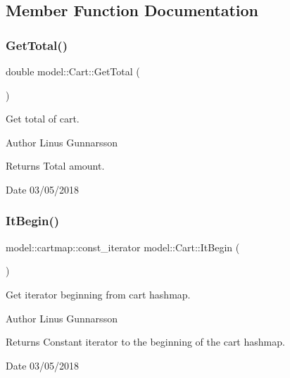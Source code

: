 \subsection{Member Function Documentation}
\mbox{\label{classmodel_1_1Cart_ad214fba3ad7b762c89e0bf5336d8a312}} 
\subsubsection{\texorpdfstring{Get\+Total()}{GetTotal()}}
{\footnotesize\ttfamily double model\+::\+Cart\+::\+Get\+Total (\begin{DoxyParamCaption}{ }\end{DoxyParamCaption})}

Get total of cart. \begin{DoxyAuthor}{Author}
Linus Gunnarsson 
\end{DoxyAuthor}
\begin{DoxyReturn}{Returns}
Total amount. 
\end{DoxyReturn}
\begin{DoxyDate}{Date}
03/05/2018 
\end{DoxyDate}
\mbox{\label{classmodel_1_1Cart_a2483c346d68425ff3d1e8ea5f50959e3}} 
\subsubsection{\texorpdfstring{It\+Begin()}{ItBegin()}}
{\footnotesize\ttfamily model\+::cartmap\+::const\+\_\+iterator model\+::\+Cart\+::\+It\+Begin (\begin{DoxyParamCaption}{ }\end{DoxyParamCaption})}

Get iterator beginning from cart hashmap. \begin{DoxyAuthor}{Author}
Linus Gunnarsson 
\end{DoxyAuthor}
\begin{DoxyReturn}{Returns}
Constant iterator to the beginning of the cart hashmap. 
\end{DoxyReturn}
\begin{DoxyDate}{Date}
03/05/2018 
\end{DoxyDate}
\mbox{\label{classmodel_1_1Cart_a83deca31686c6f0a0880e97d71ea27cc}} 
